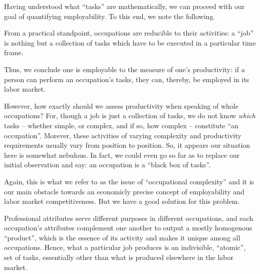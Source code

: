 \documentclass[hidelinks, nonatbib]{elsarticle}
\begin{document}
Having understood what ``tasks'' are mathematically, we can proceed with our goal of quantifying employability. To this end, we note the following.

\begin{observation}
    \label{oro}
    From a practical standpoint, occupations are reducible to their activities: a ``job'' is nothing but a collection of tasks which have to be executed in a particular time frame.
\end{observation}

Thus, we conclude one is employable to the measure of one's productivity: if a person can perform an occupation's tasks, they can, thereby, be employed in its labor market.

However, how exactly should we assess productivity when speaking of whole occupations? For, though a job is just a collection of tasks, we do not know \textit{which} tasks -- whether simple, or complex, and if so, how complex -- constitute ``an occupation''. Morever, these activities of varying complexity and productivity requirements usually vary from position to position. So, it appears our situation here is somewhat nebulous. In fact, we could even go so far as to replace our initial observation and say: an occupation is a ``black box of tasks''.

Again, this is what we refer to as the issue of ``occupational complexity'' and it is our main obstacle towards an economicly precise concept of employability and labor market competitiveness. But we have a good solution for this problem.

\begin{observation}
    \label{oao}
    Professional attributes serve different purposes in different occupations, and each occupation's attributes complement one another to output a mostly homogenous ``product'', which is the essence of its activity and makes it unique among all occupations. Hence, what a particular job produces is an indivisible, ``atomic'', set of tasks, essentially other than what is produced elsewhere in the labor market.
\end{observation}
\end{document}

